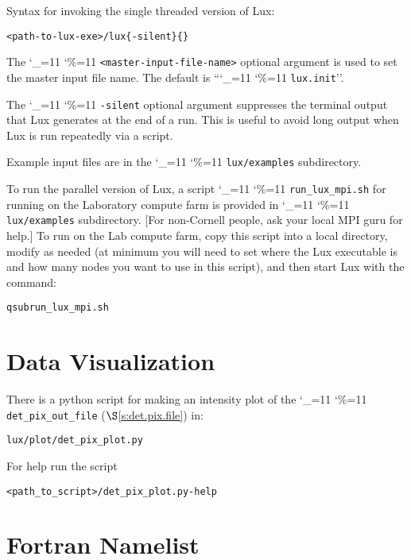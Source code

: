 \documentclass[11pt]{article}
\newcommand{\lux}{Lux\xspace}
\newcommand\ttcmd{\begingroup\catcode`\_=11 \catcode`\%=11 \dottcmd}
\newcommand\dottcmd[1]{\texttt{#1}\endgroup}
\newcommand{\vn}{\ttcmd}
\newcommand{\sref}[1]{$\S$\ref{#1}}
\newenvironment{example}
  {\vspace{\ExBeg} \begin{alltt}}
  {\end{alltt} \vspace{\ExEnd}}
\newlength{\ExBeg}
\newlength{\ExEnd}
\begin{document}
Syntax for invoking the single threaded version of \lux:
\begin{example}
 <path-to-lux-exe>/lux \{-silent\} \{<master-input-file-name>\}
\end{example}
The \vn{<master-input-file-name>} optional argument is used to set the
master input file name. The default is ``\vn{lux.init}''. 

The \vn{-silent} optional argument suppresses the terminal output that
\lux generates at the end of a run. This is useful to avoid long
output when \lux is run repeatedly via a script.

Example input files are in the \vn{lux/examples} subdirectory.

To run the parallel version of \lux, a script \vn{run_lux_mpi.sh} for
running on the Laboratory compute farm is provided in
\vn{lux/examples} subdirectory. [For non-Cornell people, ask your
local MPI guru for help.] To run on the Lab compute farm, copy this
script into a local directory, modify as needed (at minimum you will
need to set where the \lux executable is and how many nodes you want
to use in this script), and then start \lux with the command:
\begin{example}
  qsub run_lux_mpi.sh
\end{example}

\section{Data Visualization}
\label{s:vis}

There is a python script for making an intensity plot of the
\vn{det_pix_out_file} (\sref{s:det.pix.file}) in:
\begin{example}
  lux/plot/det_pix_plot.py
\end{example}
For help run the script
\begin{example}
  <path_to_script>/det_pix_plot.py -help
\end{example}

\section{Fortran Namelist}
\label{s:namelist}
\end{document}
